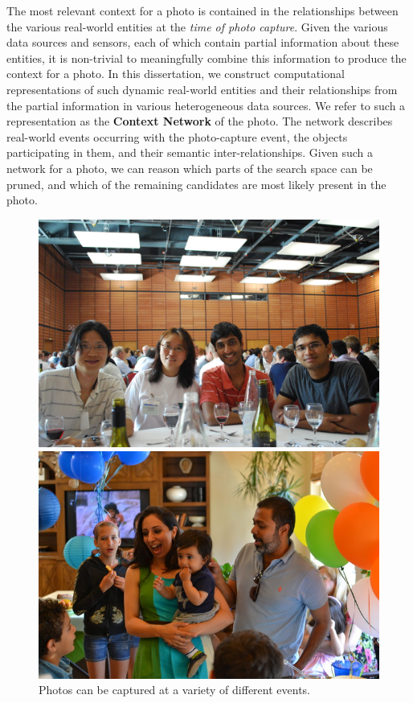 The most relevant context for a photo is contained in the relationships between the various real-world entities at the \textit{time of photo capture}. Given the various data sources and sensors, each of which contain partial information about these entities, it is non-trivial to meaningfully combine this information to produce the context for a photo. In this dissertation, we construct computational representations of such dynamic real-world entities and their relationships from the partial information in various heterogeneous data sources. We refer to such a representation as the \textbf{Context Network} of the photo. The network describes real-world events occurring with the photo-capture event, the objects participating in them, and their semantic inter-relationships. Given such a network for a photo, we can reason which parts of the search space can be pruned, and which of the remaining candidates are most likely present in the photo.

\begin{figure}[t]
\centering
\begin{minipage}[b]{0.45\linewidth}
  \includegraphics[width=\textwidth]{media/chapter1/vldb}
\end{minipage}
\begin{minipage}[b]{0.45\linewidth}
  \includegraphics[width=\textwidth]{media/chapter1/nishkas}
\end{minipage}
\caption{Photos can be captured at a variety of different events.}
\label{fig:people}
\end{figure}

